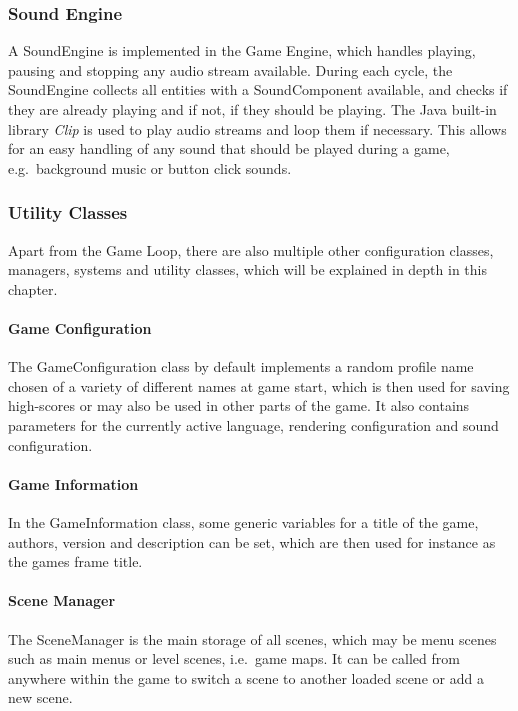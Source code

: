 \subsubsection{Sound Engine}\label{subsubsec:sound-engine}
A SoundEngine is implemented in the Game Engine, which handles playing, pausing and stopping any audio stream available.
During each cycle, the SoundEngine collects all entities with a SoundComponent available, and checks if they are already playing and if not, if they should be playing.
The Java built-in library \textit{Clip} is used to play audio streams and loop them if necessary.
This allows for an easy handling of any sound that should be played during a game, e.g.\ background music or button click sounds.

\subsubsection{Utility Classes}\label{subsubsec:utility-classes}
Apart from the Game Loop, there are also multiple other configuration classes, managers, systems and utility classes, which will be explained in depth in this chapter.
\paragraph{Game Configuration}
The GameConfiguration class by default implements a random profile name chosen of a variety of different names at game start, which is then used for saving high-scores
or may also be used in other parts of the game.
It also contains parameters for the currently active language, rendering configuration and sound configuration.

\paragraph{Game Information}
In the GameInformation class, some generic variables for a title of the game, authors, version and description can be set, which are then used for instance as the games frame
title.

\paragraph{Scene Manager}
The SceneManager is the main storage of all scenes, which may be menu scenes such as main menus or level scenes, i.e.\ game maps.
It can be called from anywhere within the game to switch a scene to another loaded scene or add a new scene.

